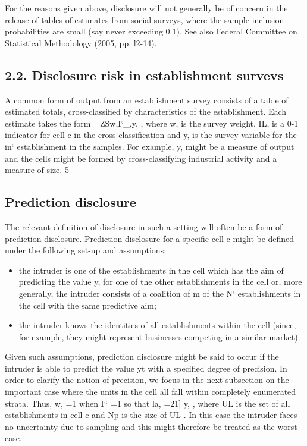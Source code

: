 For the reasons given above, disclosure will not generally be of concern in the release
of tables of estimates from social surveys, where the sample inclusion probabilities are
small (say never exceeding 0.1). See also Federal Committee on Statistical Methodology
(2005, pp. l2-14).

\subsection*{2.2. Disclosure risk in establishment survevs}
A common form of output from an establishment survey consists of a table of
estimated totals, cross-classified by characteristics of the establishment. Each estimate
takes the form  =ZSw,I‘_,y, , where w, is the survey weight, IL, is a 0-1 indicator for
cell c in the cross-classification and y, is the survey variable for the in‘ establishment in
the samples. For example, y, might be a measure of output and the cells might be
formed by cross-classifying industrial activity and a measure of size.
5


\subsection*{Prediction disclosure}
The relevant definition of disclosure in such a setting will often be a form of
prediction disclosure. Prediction disclosure for a specific cell c might be defined under
the following set-up and assumptions:
\begin{itemize}
\item the intruder is one of the establishments in the cell which has the aim of predicting
the value y, for one of the other establishments in the cell or, more generally, the
intruder consists of a coalition of m of the N‘ establishments in the cell with the same
predictive aim;
\item the intruder knows the identities of all establishments within the cell (since, for
example, they might represent businesses competing in a similar market).
\end{itemize}

Given such assumptions, prediction disclosure might be said to occur if the intruder is
able to predict the value yt with a specified degree of precision. In order to clarify the
notion of precision, we focus in the next subsection on the important case where the units
in the cell all fall within completely enumerated strata. Thus, w, =1 when I“ =1 so that
la, =21] y, , where UL is the set of all establishments in cell c and Np is the size of UL .
In this case the intruder faces no uncertainty due to sampling and this might therefore be
treated as the worst case.
